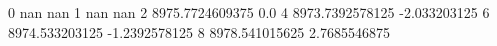 0 nan nan
1 nan nan
2 8975.7724609375 0.0
4 8973.7392578125 -2.033203125
6 8974.533203125 -1.2392578125
8 8978.541015625 2.7685546875
